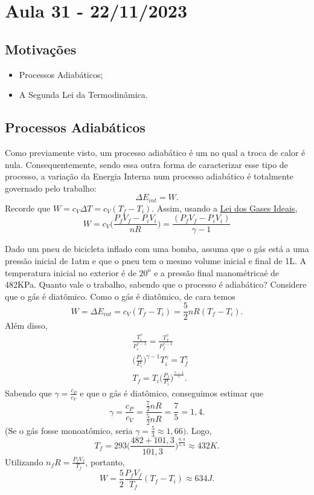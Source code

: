 \documentclass[PhysicsII/phsyicsII_notes.tex]{subfiles}
\begin{document}
\section{Aula 31 - 22/11/2023}
\subsection{Motivações}
\begin{itemize}
	\item Processos Adiabáticos;
	\item A Segunda Lei da Termodinâmica.
\end{itemize}
\subsection{Processos Adiabáticos}
Como previamente visto, um processo adiabático é um no qual a troca de calor é nula. Consequentemente,
sendo essa outra forma de caracterizar esse tipo de processo, a variação da Energia Interna num processo
adiabático é totalmente governado pelo trabalho:
\[
	\Delta E_{int} = W.
\]
Recorde que \(W=c_{V}\Delta T = c_{V}(T_{f}-T_{i})\). Assim, usando a \hyperlink{pvnrt}{Lei dos Gases Ideais},
\[
	W = c_{V}\biggl(\frac{P_{f}V_{f}-P_{i}V_{i}}{nR}\biggr) = \frac{(P_{f}V_{f}-P_{i}V_{i})}{\gamma -1}
\]
\begin{example}
	Dado um pneu de bicicleta inflado com uma bomba, assuma que o gás está a uma pressão inicial de 1atm e que o pneu tem o mesmo volume
	inicial e final de 1L. A temperatura inicial no exterior é de \(20^{\mathrm{o}}\) e a pressão final manométrica\footnotemark[1]é de 482KPa. Quanto
	vale o trabalho, sabendo que o processo é adiabático? Considere que o gás é diatômico.
	Como o gás é diatômico, de cara temos
	\[
		W = \Delta E_{int} = c_{V}(T_{f}-T_{i}) = \frac{5}{2}nR(T_{f}-T_{i}).
	\]
	Além disso,
	\begin{align*}
		 & \frac{T_{i}^{\gamma }}{P_{i}^{\gamma -1}}=\frac{T_{f}^{\gamma }}{P_{f}^{\gamma -1}} \\
		 & \biggl(\frac{P_{f}}{P_{i}}\biggr)^{\gamma -1}T_{i}^{\gamma } = T_{f}^{\gamma }      \\
		 & T_{f}=T_{i}\biggl(\frac{P_{f}}{P_{i}}\biggr)^{\frac{\gamma -1}{\gamma }}.
	\end{align*}
	Sabendo que \(\gamma  = \frac{c_{P}}{c_{V}}\) e que o gás é diatômico, conseguimos estimar que
	\[
		\gamma  = \frac{c_{P}}{c_{V}} = \frac{\frac{7}{2}nR}{\frac{5}{2}nR} = \frac{7}{5} = 1,4.
	\]
	(Se o gás fosse monoatômico, seria \(\gamma = \frac{5}{3}\approx 1,66)\). Logo,
	\[
		T_{f} = 293 \biggl(\frac{482 + 101,3}{101,3}\biggr)^{\frac{0,4}{1,4}}\approx 432K.
	\]
	Utilizando \(n_{f}R = \frac{P_{f}V_{f}}{T_{f}}\), portanto,
	\[
		W = \frac{5}{2}\frac{P_{f}V_{f}}{T_{f}}(T_{f}-T_{i})\approx 634J.
	\]
\end{example}
\end{document}

